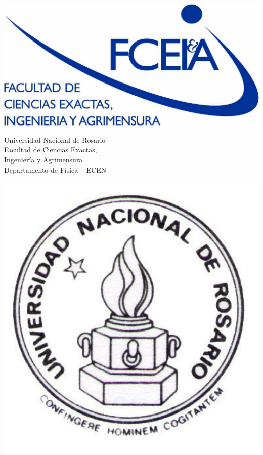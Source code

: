 \documentclass[a4paper, 12pt]{article}
\begin{document}
\renewcommand{\tablename}{Tabla}
\renewcommand{\refname}{Referencias y Bibliografía}



\begin{titlepage}

\begin{minipage}{2.6cm}
\includegraphics[width=\textwidth]{fceia.pdf}
\end{minipage}
\hfill
%
\begin{minipage}{6cm}
\begin{center}
\normalsize{Universidad Nacional de Rosario\\
Facultad de Ciencias Exactas,\\
Ingeniería y Agrimensura\\
Departamento de Física -- ECEN\\}
\end{center}
\end{minipage}
\hspace{0.5cm}
\hfill
\begin{minipage}{2.6cm}
\includegraphics[width=\textwidth]{unr.pdf}
\end{minipage}



\end{titlepage}
\end{document}
